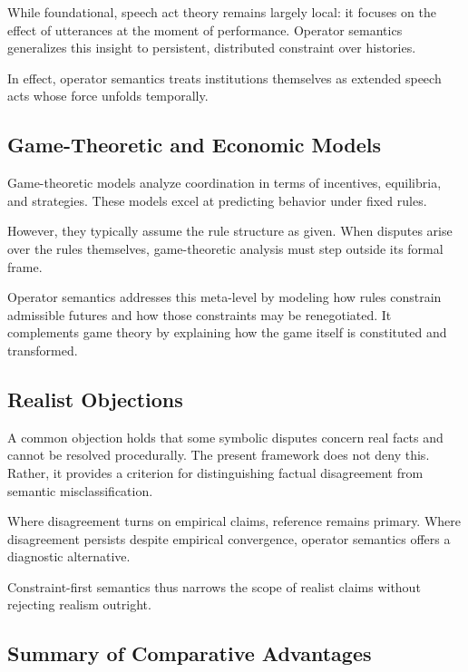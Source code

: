 \documentclass[11pt]{article}
\begin{document}
While foundational, speech act theory remains largely local: it focuses on the
effect of utterances at the moment of performance. Operator semantics generalizes
this insight to persistent, distributed constraint over histories.

In effect, operator semantics treats institutions themselves as extended speech
acts whose force unfolds temporally.

\subsection{Game-Theoretic and Economic Models}

Game-theoretic models analyze coordination in terms of incentives, equilibria,
and strategies. These models excel at predicting behavior under fixed rules.

However, they typically assume the rule structure as given. When disputes arise
over the rules themselves, game-theoretic analysis must step outside its formal
frame.

Operator semantics addresses this meta-level by modeling how rules constrain
admissible futures and how those constraints may be renegotiated. It complements
game theory by explaining how the game itself is constituted and transformed.

\subsection{Realist Objections}

A common objection holds that some symbolic disputes concern real facts and
cannot be resolved procedurally. The present framework does not deny this.
Rather, it provides a criterion for distinguishing factual disagreement from
semantic misclassification.

Where disagreement turns on empirical claims, reference remains primary. Where
disagreement persists despite empirical convergence, operator semantics offers a
diagnostic alternative.

Constraint-first semantics thus narrows the scope of realist claims without
rejecting realism outright.

\subsection{Summary of Comparative Advantages}
\end{document}

